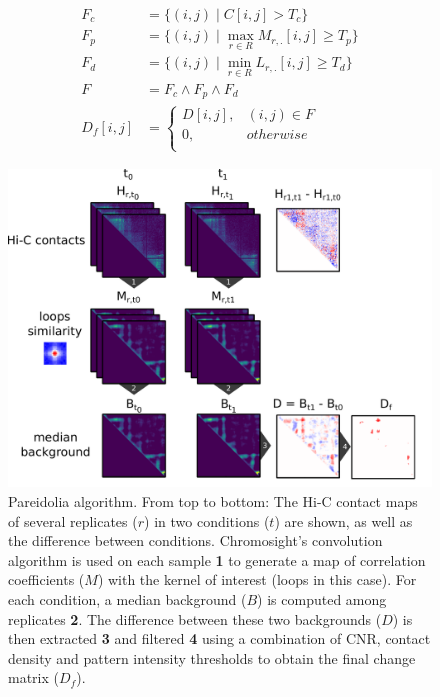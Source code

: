 \begin{align}
    \label{eqn:02-01:filter-c}
    F_c &= \{ (i,j) \mid C[i,j] > T_c \} \\
    \label{eqn:02-01:filter-p}
    F_p &= \{ (i, j) \mid \max_{r \in R}{M_{r, .}[i, j]} \geq T_p \} \\
    \label{eqn:02-01:filter-d}
    F_d &= \{ (i, j) \mid \min_{r \in R}{L_{r, .}[i, j]} \geq T_d \} \\
    \label{eqn:02-01:filters}
    F   &= F_c \land F_p \land F_d \\
    \label{eqn:02-01:filter-diff}
    D_f[i, j] &= 
    \begin{cases}
        D[i, j], & (i, j) \in F \\
        0, & otherwise \\
    \end{cases}
\end{align}

\begin{figure}[htb]
    \includegraphics[width=\textwidth]{Parts/Part02/gfx/pareidolia_process.pdf}
    \caption[Pareidolia algorithm.]{Pareidolia algorithm. From top to bottom: The Hi-C contact maps of several replicates ($r$) in two conditions ($t$) are shown, as well as the difference between conditions. Chromosight's convolution algorithm is used on each sample \textbf{1} to generate a map of correlation coefficients ($M$) with the kernel of interest (loops in this case). For each condition, a median background ($B$) is computed among replicates \textbf{2}. The difference between these two backgrounds ($D$) is then extracted \textbf{3} and filtered \textbf{4} using a combination of \acrshort{CNR}, contact density and pattern intensity thresholds to obtain the final change matrix ($D_f$).}
    \label{fig:02-01:pareidolia}
\end{figure}

